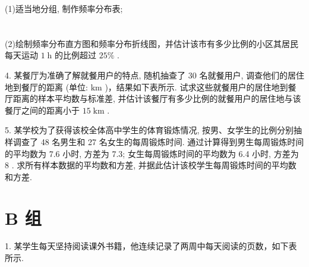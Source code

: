 \documentclass[10pt]{article}
\begin{document}
(1)适当地分组, 制作频率分布表;

\section*{}

(2)绘制频率分布直方图和频率分布折线图，并估计该市有多少比例的小区其居民每天运动 \(1\mathrm{\;h}\) 的比例超过 \({25}\%\) .

4. 某餐厅为准确了解就餐用户的特点, 随机抽查了 30 名就餐用户, 调查他们的居住地到餐厅的距离 (单位: \(\mathrm{{km}}\) )，结果如下表所示. 试求这些就餐用户的居住地到餐厅距离的样本平均数与标准差, 并估计该餐厅有多少比例的就餐用户的居住地与该餐厅之间的距离小于 \({15}\mathrm{\;{km}}\) .

\begin{center}
\end{center}

5. 某学校为了获得该校全体高中学生的体育锻炼情况, 按男、女学生的比例分别抽样调查了 48 名男生和 27 名女生的每周锻炼时间. 通过计算得到男生每周锻炼时间的平均数为 7.6 小时, 方差为 7.3; 女生每周锻炼时间的平均数为 6.4 小时, 方差为 8 . 求所有样本数据的平均数和方差, 并据此估计该校学生每周锻炼时间的平均数和方差.

\section*{B 组}

1. 某学生每天坚持阅读课外书籍，他连续记录了两周中每天阅读的页数，如下表所示.

\begin{center}
\end{center}
\end{document}
